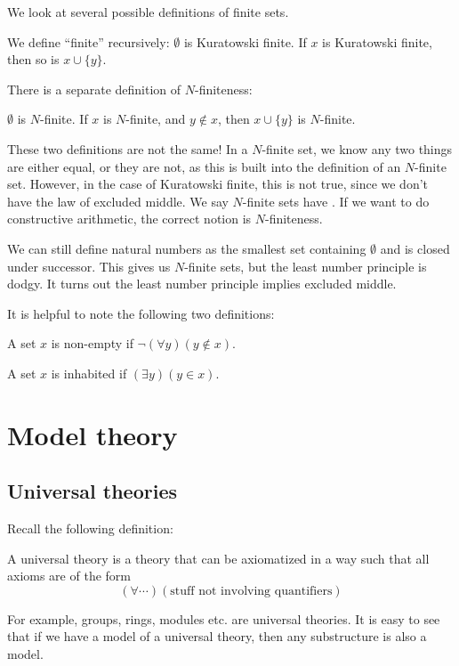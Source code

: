 \documentclass[a4paper]{article}
\begin{document}
We look at several possible definitions of finite sets.
\begin{defi}
  We define ``finite'' recursively: $\emptyset$ is Kuratowski finite. If $x$ is Kuratowski finite, then so is $x \cup \{y\}$.
\end{defi}

There is a separate definition of $N$-finiteness:
\begin{defi}[$N$-finite]
  $\emptyset$ is $N$-finite. If $x$ is $N$-finite, and $y \not \in x$, then $x \cup \{y\}$ is $N$-finite.
\end{defi}
These two definitions are not the same! In a $N$-finite set, we know any two things are either equal, or they are not, as this is built into the definition of an $N$-finite set. However, in the case of Kuratowski finite, this is not true, since we don't have the law of excluded middle. We say $N$-finite sets have .
If we want to do constructive arithmetic, the correct notion is $N$-finiteness.

We can still define natural numbers as the smallest set containing $\emptyset$ and is closed under successor. This gives us $N$-finite sets, but the least number principle is dodgy. It turns out the least number principle implies excluded middle.

It is helpful to note the following two definitions:
\begin{defi}
  A set $x$ is non-empty if $\neg (\forall y)(y \not \in x)$.
\end{defi}

\begin{defi}
  A set $x$ is inhabited if $(\exists y)(y \in x)$.
\end{defi}

\section{Model theory}

\subsection{Universal theories}
Recall the following definition:
\begin{defi}
  A universal theory is a theory that can be axiomatized in a way such that all axioms are of the form
  \[
    (\forall \cdots)(\text{stuff not involving quantifiers})\tag{$*$}
  \]
\end{defi}
For example, groups, rings, modules etc. are universal theories. It is easy to see that if we have a model of a universal theory, then any substructure is also a model.
\end{document}
